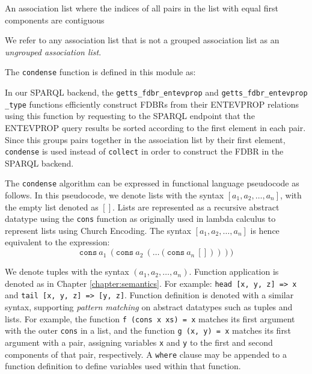 \documentclass[../main.tex]{subfiles}
\begin{document}
\begin{definition}
	An association list where the indices of all pairs in the list with equal first components are contiguous
\end{definition}

We refer to any association list that is not a grouped association list as an {\em ungrouped association list}.

The \texttt{condense} function is defined in this module as:


In our SPARQL backend, the \texttt{getts\_fdbr\_entevprop} and \texttt{getts\_fdbr\_entevprop\\\_type} functions efficiently construct FDBRs from their ENTEVPROP relations using this function by requesting to the SPARQL endpoint that the ENTEVPROP query results be sorted according to the first element in each pair.  Since this groups pairs together in the association list by their first element, \texttt{condense} is used instead of \texttt{collect} in order to construct the FDBR in the SPARQL backend.

The \texttt{condense} algorithm can be expressed in functional language pseudocode as follows.
In this pseudocode, we denote lists with the syntax $[a_1, a_2, \dots, a_n]$, with the empty list
denoted as $[]$.  Lists are represented as a recursive abstract datatype using the \texttt{cons} function as originally used in lambda calculus
to represent lists using Church Encoding\cite{jansen2013programming}.  The syntax $[a_1, a_2, \dots, a_n]$ is hence equivalent to the expression: \[ \mathtt{cons}\ a_1\ (\mathtt{cons}\ a_2\ (\dots (\mathtt{cons}\ a_n\ [])))) \]

We denote tuples with the syntax $(a_1, a_2, \dots, a_n)$.
Function application is denoted as in Chapter \ref{chapter:semantics}.
For example: \texttt{head [x, y, z] => x} and \texttt{tail [x, y, z] => [y, z]}.
Function definition is denoted with a similar syntax, supporting {\em pattern matching} on abstract datatypes such
as tuples and lists.  For example, the function \texttt{f (cons x xs) = x} matches its first argument with the outer \texttt{cons} in a list, and the function \texttt{g (x, y) = x} matches its first argument with a pair, assigning variables \texttt{x} and \texttt{y} to the first and second components of that pair, respectively.  A \texttt{where} clause may be appended to a function definition to define variables used within that function.  %
\end{document}
